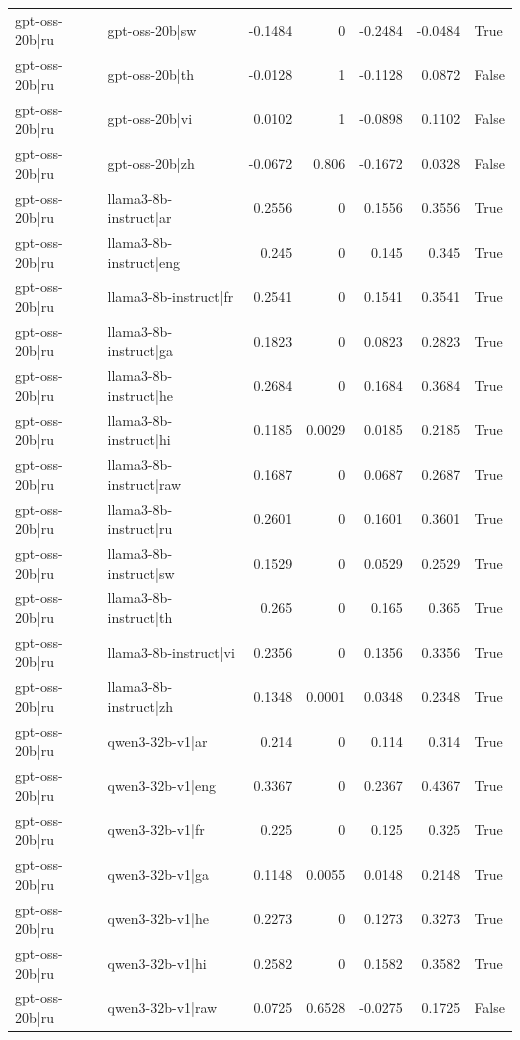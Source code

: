 \begin{table}
\begin{tabular}{l l r r r r l}
gpt-oss-20b|ru & gpt-oss-20b|sw & -0.1484 & 0 & -0.2484 & -0.0484 & True \\
gpt-oss-20b|ru & gpt-oss-20b|th & -0.0128 & 1 & -0.1128 & 0.0872 & False \\
gpt-oss-20b|ru & gpt-oss-20b|vi & 0.0102 & 1 & -0.0898 & 0.1102 & False \\
gpt-oss-20b|ru & gpt-oss-20b|zh & -0.0672 & 0.806 & -0.1672 & 0.0328 & False \\
gpt-oss-20b|ru & llama3-8b-instruct|ar & 0.2556 & 0 & 0.1556 & 0.3556 & True \\
gpt-oss-20b|ru & llama3-8b-instruct|eng & 0.245 & 0 & 0.145 & 0.345 & True \\
gpt-oss-20b|ru & llama3-8b-instruct|fr & 0.2541 & 0 & 0.1541 & 0.3541 & True \\
gpt-oss-20b|ru & llama3-8b-instruct|ga & 0.1823 & 0 & 0.0823 & 0.2823 & True \\
gpt-oss-20b|ru & llama3-8b-instruct|he & 0.2684 & 0 & 0.1684 & 0.3684 & True \\
gpt-oss-20b|ru & llama3-8b-instruct|hi & 0.1185 & 0.0029 & 0.0185 & 0.2185 & True \\
gpt-oss-20b|ru & llama3-8b-instruct|raw & 0.1687 & 0 & 0.0687 & 0.2687 & True \\
gpt-oss-20b|ru & llama3-8b-instruct|ru & 0.2601 & 0 & 0.1601 & 0.3601 & True \\
gpt-oss-20b|ru & llama3-8b-instruct|sw & 0.1529 & 0 & 0.0529 & 0.2529 & True \\
gpt-oss-20b|ru & llama3-8b-instruct|th & 0.265 & 0 & 0.165 & 0.365 & True \\
gpt-oss-20b|ru & llama3-8b-instruct|vi & 0.2356 & 0 & 0.1356 & 0.3356 & True \\
gpt-oss-20b|ru & llama3-8b-instruct|zh & 0.1348 & 0.0001 & 0.0348 & 0.2348 & True \\
gpt-oss-20b|ru & qwen3-32b-v1|ar & 0.214 & 0 & 0.114 & 0.314 & True \\
gpt-oss-20b|ru & qwen3-32b-v1|eng & 0.3367 & 0 & 0.2367 & 0.4367 & True \\
gpt-oss-20b|ru & qwen3-32b-v1|fr & 0.225 & 0 & 0.125 & 0.325 & True \\
gpt-oss-20b|ru & qwen3-32b-v1|ga & 0.1148 & 0.0055 & 0.0148 & 0.2148 & True \\
gpt-oss-20b|ru & qwen3-32b-v1|he & 0.2273 & 0 & 0.1273 & 0.3273 & True \\
gpt-oss-20b|ru & qwen3-32b-v1|hi & 0.2582 & 0 & 0.1582 & 0.3582 & True \\
gpt-oss-20b|ru & qwen3-32b-v1|raw & 0.0725 & 0.6528 & -0.0275 & 0.1725 & False \\

\end{tabular}
\end{table}
